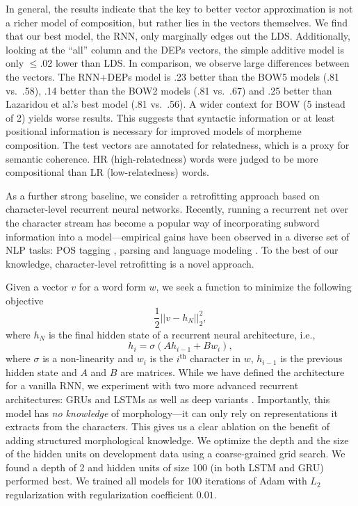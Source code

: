 \documentclass[11pt,letterpaper]{article}
\begin{document}
In general, the results indicate that the key  to better
vector approximation is not a richer model of composition, but
rather lies in the vectors themselves. We find that our best model, the
RNN, only marginally edges out the LDS. Additionally, 
looking at the ``all'' column and the DEPs vectors,
the simple
additive model is only $\leq$.02 lower than LDS.
In comparison, we
observe large differences between the vectors. The RNN+DEPs model 
is .23 better than
the BOW5 models (.81 vs.\ .58), .14 better than the BOW2
models 
(.81 vs.\ .67)
and .25
better than
Lazaridou et al.'s best model (.81 vs.\ .56). 
A wider context for BOW (5 instead of 2)
yields   worse results. This suggests  that syntactic information
or at least positional information  is necessary for
improved models of morpheme composition.
The test vectors are annotated for relatedness, which is a
proxy for semantic coherence.  HR (high-relatedness) words were judged
to be more compositional than LR (low-relatedness) words.


As a further strong baseline, we consider a retrofitting
\cite{faruqui2015retrofitting} approach based on character-level
recurrent neural networks. Recently, running a recurrent net over the
character stream has become a popular way of incorporating subword
information into a model---empirical gains have been observed in
a diverse set of NLP tasks: POS tagging
\cite{santos2014learning,LingDBTFAML15}, parsing
\cite{ballesterosimproved} and language modeling \cite{KimJSR16}.
To the best of our knowledge, character-level retrofitting is a novel approach.

Given a vector $v$ for a word form $w$, we seek a function
to minimize the following objective
\begin{equation}
  \frac{1}{2}||v - h_N||_2^2, 
\end{equation}
where $h_N$ is the final hidden state of a recurrent neural architecture, i.e.,
\begin{equation}
  h_i = \sigma(A h_{i-1} + B w_i),
\end{equation}
where $\sigma$ is a non-linearity and $w_i$ is the $i^\text{th}$
character in $w$, $h_{i-1}$ is the previous hidden state and $A$ and
$B$ are matrices. While we have defined the architecture for a vanilla
RNN, we experiment with two more advanced recurrent architectures:
GRUs \cite{cho2014learningLSTM} and LSTMs \cite{hochreiter1997long} as
well as deep variants
\cite{sutskever14seq2seq,gillick15bytes,firat16multiway}.
Importantly, this model has {\em no knowledge} of morphology---it can
only rely on representations it extracts from the characters. This
gives us a clear ablation on the benefit of adding structured
morphological knowledge.  We optimize the depth and the size of
the hidden units on development data using a coarse-grained grid
search. We found a depth of 2 and hidden units of size 100 (in both
LSTM and GRU) performed best. We trained all models for 100 iterations
of Adam \cite{kingma2014adam} with $L_2$ regularization with
regularization coefficient $0.01$.
\end{document}
